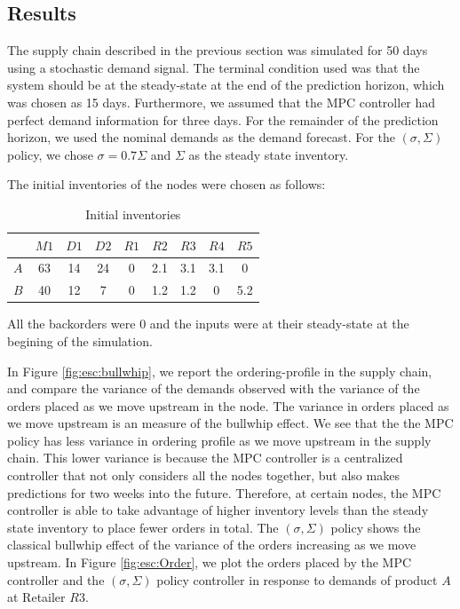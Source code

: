 \subsection{Results}
The supply chain described in the previous section was simulated for
50 days using a stochastic demand signal. The terminal
condition used was that the system should be at the steady-state
at the end of the prediction horizon,
which was chosen as 15 days. Furthermore, we assumed that the MPC
controller had perfect demand information for three days. For the
remainder of the prediction horizon, we used the nominal demands as
the demand forecast. For the $(\sigma,\Sigma)$ policy, we chose
$\sigma = 0.7\Sigma$ and $\Sigma$ as the steady state inventory. 

The initial inventories of the nodes were chosen as follows:
\begin{table}[h]
\caption{Initial inventories}
\label{tab:esc:initial}
\begin{center}
\begin{tabular}{ccccccccc}\toprule
& $M1$ & $D1$ & $D2$  & $R1$ & $R2$ & $R3$ & $R4$ & $R5$ \\
\midrule
$A$                      &63   &14   &24   &0 &2.1  &3.1  &3.1&0 \\
$B$                      &40   &12   &7    &0 &1.2  &1.2  &0  &5.2   \\
\bottomrule
\end{tabular}
\end{center}
\end{table}
All the backorders were $0$ and the inputs were at their steady-state
at the begining of the simulation.

In Figure \ref{fig:esc:bullwhip}, we report the ordering-profile in the supply
chain, and compare the variance of the demands observed with the
variance of the orders placed as we move upstream in the node. The
variance in orders placed as we move upstream is an measure of the
bullwhip effect. We see that the the MPC policy has less variance in
ordering profile as we move upstream in the supply chain. This lower
variance is because the MPC controller is a centralized controller that not only
considers all the nodes together, but also makes predictions for two
weeks into the future. Therefore, at certain nodes, the MPC controller is able to take
advantage of higher inventory levels than the steady state inventory
to place fewer orders in total. The $(\sigma,\Sigma)$ policy shows the
classical bullwhip effect of the variance of the orders increasing as
we move upstream. In Figure \ref{fig:esc:Order}, we plot the orders placed by the MPC
controller and the $(\sigma,\Sigma)$ policy controller in response to
demands of product $A$ at Retailer $R3$.


